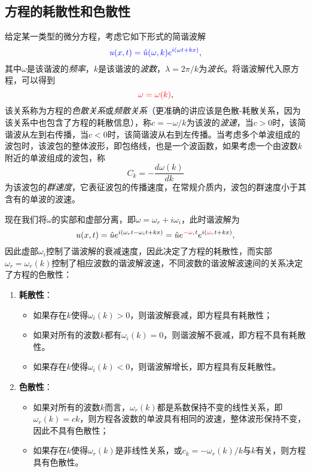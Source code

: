 \documentclass[a4paper,10pt]{ctexart}
\begin{document}
\subsection{方程的耗散性和色散性}
给定某一类型的微分方程，考虑它如下形式的简谐波解
\begin{equation}
    \textcolor{blue}{u(x,t) = \hat{u}(\omega,k) e^{i(\omega t + kx)}},
\end{equation}
其中$ \omega $是该谐波的\emph{频率}，$ k $是该谐波的\emph{波数}，$ \lambda = 2\pi / k $为\emph{波长}。将谐波解代入原方程，可以得到
\begin{equation}
    \textcolor{red}{\omega = \omega(k)},
\end{equation}
该关系称为方程的\emph{色散关系}或\emph{频散关系}（更准确的讲应该是色散-耗散关系，因为该关系中也包含了方程的耗散信息），称$ c = -\omega / k $为该波的\emph{波速}，当$ c>0 $时，该简谐波从左到右传播，当$ c<0 $时，该简谐波从右到左传播。当考虑多个单波组成的波包时，该波包的整体波形，即包络线，也是一个波函数，如果考虑一个由波数$ k $附近的单波组成的波包，称
\begin{equation}
    C_k = -\frac{d \omega(k)}{dk}
\end{equation}
为该波包的\emph{群速度}，它表征波包的传播速度，在常规介质内，波包的群速度小于其含有的单波的波速。

现在我们将$ \omega $的实部和虚部分离，即$ \omega = \omega_r +i\omega_i $，此时谐波解为
\[
    u(x,t) = \hat{u} e^{i(\omega_r t - \omega_i t + kx)} = \hat{u} e^{\textcolor{red}{-\omega_i} t} e^{i(\textcolor{red}{\omega_r} t + kx)},
\]
因此虚部$ \omega_i $控制了谐波解的衰减速度，因此决定了方程的耗散性，而实部$ \omega_r=\omega_r(k) $控制了相应波数的谐波解波速，不同波数的谐波解波速间的关系决定了方程的色散性：
\begin{enumerate}
    \item \textbf{耗散性}：
    \begin{itemize}
        \item 如果存在$ k $使得$ \omega_i(k)>0 $，则谐波解衰减，即方程具有耗散性；
        \item 如果对所有的波数$ k $都有$ \omega_i(k)=0 $，则谐波解不衰减，即方程不具有耗散性。
        \item 如果存在$ k $使得$ \omega_i(k)<0 $，则谐波解增长，即方程具有反耗散性。
    \end{itemize}
    \item \textbf{色散性}：
    \begin{itemize}
        \item 如果对所有的波数$ k $而言，$ \omega_r(k) $都是系数保持不变的线性关系，即$ \omega_r(k) = ck $，则方程各波数的单波具有相同的波速，整体波形保持不变，因此不具有色散性；
        \item 如果存在$ k $使得$ \omega_r(k) $是非线性关系，或$ c_k=-\omega_r(k) / k $与$ k $有关，则方程具有色散性。
    \end{itemize}
\end{enumerate}
\end{document}
